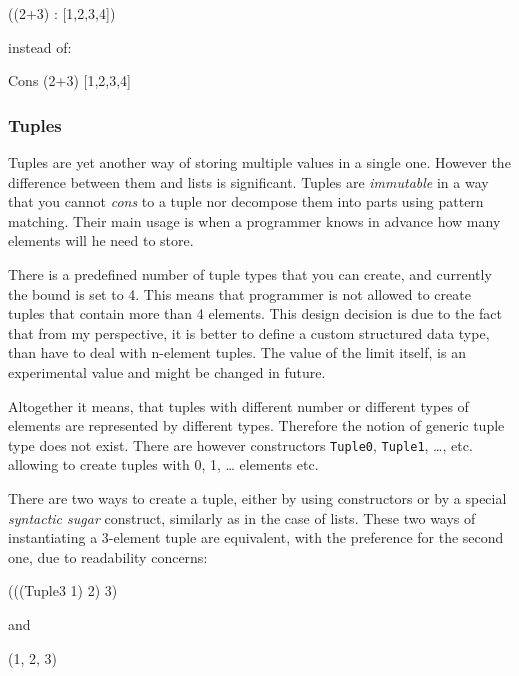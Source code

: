 \documentclass[12pt,a4paper]{report}
\begin{document}
\vspace*{0.2in}
\begin{code}[style=haskell]
  ((2+3) : [1,2,3,4])
\end{code}

instead of:

\vspace*{0.2in}
\begin{code}[style=haskell]
  Cons (2+3)  [1,2,3,4]
\end{code}

\subsubsection{Tuples}
Tuples are yet another way of storing multiple values in a single one. However
the difference between them and lists is significant. Tuples are
\textit{immutable} in a way that you cannot \textit{cons} to a tuple nor
decompose them into parts using pattern matching. Their main usage is when a
programmer knows in advance how many elements will he need to store.

There is a predefined number of tuple types that you can create, and currently
the bound is set to 4. This means that programmer is not allowed to create
tuples that contain more than 4 elements. This design decision is due to the
fact that from my perspective, it is better to define a custom structured data
type, than have to deal with n-element tuples. The value of the limit itself,
is an experimental value and might be changed in future.

Altogether it means, that tuples with different number or different types of
elements are represented by different types. Therefore the notion of generic
tuple type does not exist. There are however constructors \texttt{Tuple0},
\texttt{Tuple1}, \ldots, etc. allowing to create tuples with 0, 1, \ldots
elements etc.

There are two ways to create a tuple, either by using constructors or by a
special \textit{syntactic sugar} construct, similarly as in the case of lists.
These two ways of instantiating a 3-element tuple are equivalent, with the
preference for the second one, due to readability concerns:

\vspace*{0.2in}
\begin{code}[style=haskell]
  (((Tuple3 1) 2) 3)
\end{code}

and

\vspace*{0.2in}
\begin{code}[style=haskell]
  (1, 2, 3)
\end{code}
\end{document}
